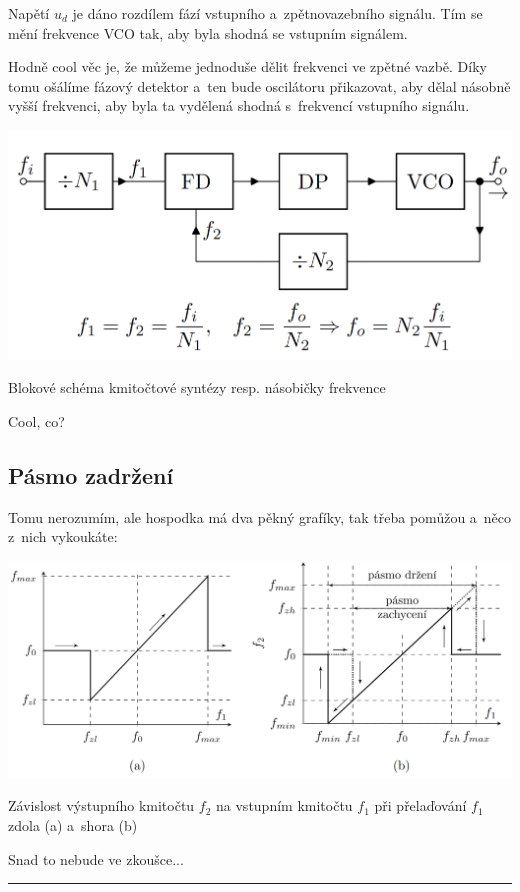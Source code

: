 \documentclass[a4paper,12pt]{article}   %
\begin{document}
Napětí $u_d$ je dáno rozdílem fází vstupního a~zpětnovazebního signálu. Tím se mění frekvence VCO tak, aby byla shodná se vstupním signálem.

Hodně cool věc je, že můžeme jednoduše dělit frekvenci ve zpětné vazbě. Díky tomu ošálíme fázový detektor a~ten bude oscilátoru přikazovat, aby dělal násobně vyšší frekvenci, aby byla ta vydělená shodná s~frekvencí vstupního signálu.

\begin{graf}[h!]
    \centering
    \includegraphics[width = .6\textwidth]{fazovy_zaves-deleni.PNG}
    \caption{Blokové schéma kmitočtové syntézy resp. násobičky frekvence}
\end{graf}
Cool, co?

\subsection*{Pásmo zadržení}
Tomu nerozumím, ale hospodka má dva pěkný grafíky, tak třeba pomůžou a~něco z~nich vykoukáte:
\begin{graf}[h!]
    \centering
    \includegraphics[width=\textwidth]{pasmo_zadrzeni.PNG}
    \caption{Závislost výstupního kmitočtu $f_2$ na vstupním kmitočtu $f_1$ při přelaďování $f_1$ zdola (a) a~shora (b)}
    \label{graf:pasmo:zadrzeni}
\end{graf}

Snad to nebude ve zkoušce...
 \\






\hrule%
\end{document}
